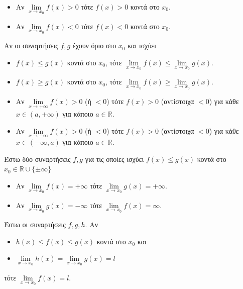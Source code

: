 \vspace{-5mm}
\begin{itemize}
\item Αν $\lim\limits_{x\to x_0}{f(x)}>0$ τότε $f(x)>0$ κοντά στο $x_0$.
\item Αν $\lim\limits_{x\to x_0}{f(x)}<0$ τότε $f(x)<0$ κοντά στο $x_0$.
\end{itemize}
Αν οι συναρτήσεις $f,g$ έχουν όριο στο $x_0$ και ισχύει
\begin{itemize}
\item $f(x)\leq g(x)$ κοντά στο $x_0$, τότε $\lim\limits_{x\to x_0}{f(x)}\leq\lim\limits_{x\to x_0}{g(x)}$.
\item $f(x)\geq g(x)$ κοντά στο $x_0$, τότε $\lim\limits_{x\to x_0}{f(x)}\geq\lim\limits_{x\to x_0}{g(x)}$.
\end{itemize}
\vspace{-5mm}
\begin{itemize}
\item Αν $\lim\limits_{x\to +\infty}{f(x)}>0$ (ή $<0$) τότε $f(x)>0$ (αντίστοιχα $<0$) για κάθε $x\in(a,+\infty)$ για κάποιο $a\in\mathbb{R}$.
\item Αν $\lim\limits_{x\to -\infty}{f(x)}>0$ (ή $<0$) τότε $f(x)>0$ (αντίστοιχα $<0$) για κάθε $x\in(-\infty,a)$ για κάποιο $a\in\mathbb{R}$.
\end{itemize}
Έστω δύο συναρτήσεις $f,g$ για τις οποίες ισχύει $f(x)\leq g(x)$ κοντά στο $x_0\in\mathbb{R}\cup\{\pm\infty\}$
\begin{itemize}
\item Αν $\lim\limits_{x\to x_0}{f(x)}=+\infty$ τότε $\lim\limits_{x\to x_0}{g(x)}=+\infty$.
\item Αν $\lim\limits_{x\to x_0}{g(x)}=-\infty$ τότε $\lim\limits_{x\to x_0}{f(x)}=\infty$.
\end{itemize}
Έστω οι συναρτήσεις $f, g, h$. Αν
\begin{itemize}
\item $h(x)\leq f(x)\leq g(x)$ κοντά στο $x_0$ και
\item $\lim\limits_{x\to x_0}{h(x)}=\lim\limits_{x\to x_0}{g(x)}=l$
\end{itemize}
τότε $\lim\limits_{x\to x_0}{f(x)}=l$.\\\\

